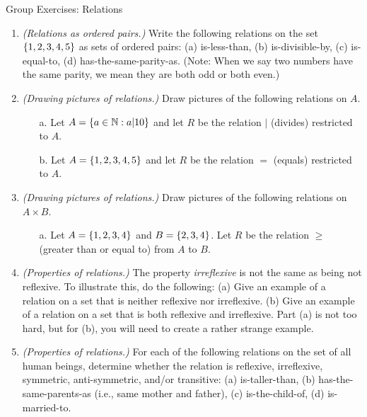\documentclass[10pt]{beamer}
\begin{document}
\begin{frame}{Group Exercises: Relations}
\footnotesize 
\begin{enumerate}
	\item \textit{(Relations as ordered pairs.)}  Write the following relations on the set $\{ {1,2,3,4,5} \}$ as sets of ordered pairs: (a) is-less-than, (b) is-divisible-by, (c) is-equal-to, (d) has-the-same-parity-as.  (Note: When we say two numbers have the same parity, we mean they are both odd or both even.)
\item \textit{(Drawing pictures of relations.)} 
	Draw pictures of the following relations on $A$. 
	\begin{itemize} \footnotesize 
		\item[a.] Let $A=\{ {a \in \mathbb{N} : a|10} \}$ and let $R$ be the relation $|$ (divides) restricted to $A$. 
		\item[b.] Let $A=\{ {1,2,3,4,5} \}$ and let $R$ be the relation  $=$ (equals) restricted to $A$.
	\end{itemize}
\item \textit{(Drawing pictures of relations.)}  Draw pictures of the following relations on $A \times B$.
	\begin{itemize} \footnotesize 
		 \item[a.] Let $A=\{ {1,2,3,4} \}$ and $B = \{ {2,3,4} \}$. Let $R$ be the relation $\geq$ (greater than or equal to) from $A$ to $B$.
	\end{itemize}

	\item \textit{(Properties of relations.)} The property \textit{irreflexive} is not the same as being not reflexive.  To illustrate this, do the following: (a) Give an example of a relation on a set that is neither reflexive nor irreflexive.  (b) Give an example of a relation on a set that is both reflexive and irreflexive.  
	Part (a) is not too hard, but for (b), you will need to create a rather strange example.
	
	\item \textit{(Properties of relations.)} For each of the following relations on the set of all human beings, determine whether the relation is reflexive, irreflexive, symmetric, anti-symmetric, and/or transitive: (a) is-taller-than, (b) has-the-same-parents-as (i.e., same mother and father), (c)  is-the-child-of, (d) is-married-to.


\end{enumerate}
\end{frame}
\end{document}
